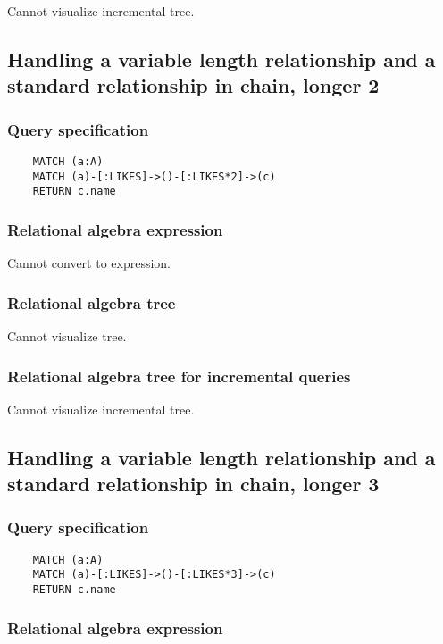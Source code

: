 	Cannot visualize incremental tree.
	\subsection{Handling a variable length relationship and a standard relationship in chain, longer 2}

	\subsubsection*{Query specification}

	\begin{lstlisting}
	MATCH (a:A)
	MATCH (a)-[:LIKES]->()-[:LIKES*2]->(c)
	RETURN c.name
	\end{lstlisting}


	\subsubsection*{Relational algebra expression}

	Cannot convert to expression.

	\subsubsection*{Relational algebra tree}

	Cannot visualize tree.

	\subsubsection*{Relational algebra tree for incremental queries}

	Cannot visualize incremental tree.
	\subsection{Handling a variable length relationship and a standard relationship in chain, longer 3}

	\subsubsection*{Query specification}

	\begin{lstlisting}
	MATCH (a:A)
	MATCH (a)-[:LIKES]->()-[:LIKES*3]->(c)
	RETURN c.name
	\end{lstlisting}


	\subsubsection*{Relational algebra expression}

